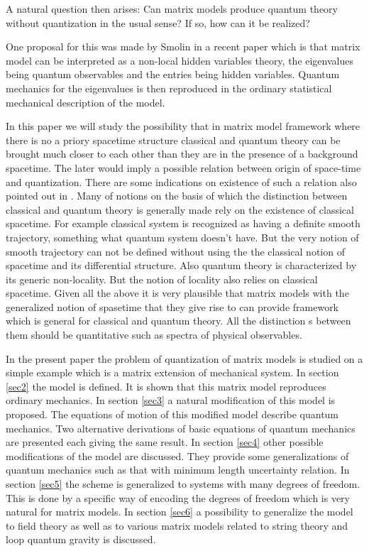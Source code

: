\documentclass[a4paper,11pt]{article}
\begin{document}
A natural question then arises: Can matrix models produce quantum
theory without quantization in the usual sense? If so, how can it
be realized?

One proposal for this was made by Smolin in a recent paper
\cite{hiddenvar} which is that matrix model can be interpreted as
a non-local hidden variables theory, the eigenvalues being quantum
observables and the entries being hidden variables. Quantum
mechanics for the eigenvalues is then reproduced in the ordinary
statistical mechanical description of the model.

In this paper we will study the possibility that in matrix model
framework where there is no a priory spacetime structure classical
and quantum theory can be brought much closer to each other than
they are in the presence of a background spacetime. The later
would imply a possible relation between origin of space-time and
quantization. There are some indications on existence of such a
relation also pointed out in \cite{hiddenvar}. Many of notions on
the basis of which the distinction between classical and quantum
theory is generally made rely on the existence of classical
spacetime. For example classical system is recognized as having a
definite smooth trajectory, something what quantum system doesn't
have. But the very notion of smooth trajectory can not be defined
without using the the classical notion of spacetime and its
differential structure. Also quantum theory is characterized by
its generic non-locality. But the notion of locality also relies
on classical spacetime.  Given all the above it is very plausible
that matrix models with the generalized notion of spasetime that
they give rise to can provide framework which is general for
classical and quantum theory. All the distinction s between them
should be quantitative such as spectra of physical observables.

In the present paper the problem of quantization of matrix models
is studied on a simple example which is a matrix extension of
mechanical system. In section \ref{sec2} the model is defined. It
is shown that this matrix model reproduces ordinary mechanics. In
section \ref{sec3} a natural modification of this model is
proposed. The equations of motion of this modified model describe
quantum mechanics. Two alternative derivations of basic equations
of quantum mechanics are presented each giving the same result. In
section \ref{sec4} other possible modifications of the model are
discussed. They provide some generalizations of quantum mechanics
such as that with minimum length uncertainty relation. In section
\ref{sec5} the scheme is generalized to systems with many degrees
of freedom. This is done by a specific way of encoding the degrees
of freedom which is very natural for matrix models. In section
\ref{sec6} a possibility to generalize the model  to field theory
as well as to various matrix models related to string theory and
loop quantum gravity is discussed.
\end{document}
